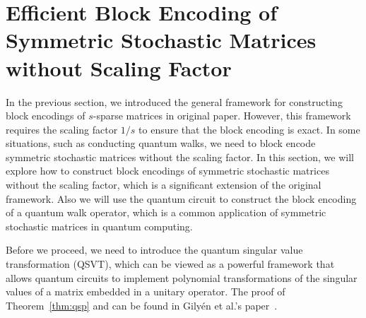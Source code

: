 \documentclass{article}
\begin{document}
    \section{Efficient Block Encoding of Symmetric Stochastic Matrices without Scaling Factor}\label{sec:efficient-block-encoding-of-symmetric-stochastic-matrices-without-scaling-factor}
    In the previous section, we introduced the general framework for constructing block encodings of $s$-sparse matrices in original paper.
    However, this framework requires the scaling factor $1/s$ to ensure that the block encoding is exact.
    In some situations, such as conducting quantum walks, we need to block encode symmetric stochastic matrices without the scaling factor.
    In this section, we will explore how to construct block encodings of symmetric stochastic matrices without the scaling factor, which is a significant extension of the original framework.
    Also we will use the quantum circuit to construct the block encoding of a quantum walk operator, which is a common application of symmetric stochastic matrices in quantum computing.

    Before we proceed, we need to introduce the quantum singular value transformation (QSVT), which can be viewed as a powerful framework that allows quantum circuits to implement polynomial transformations of the singular values of a matrix embedded in a unitary operator.
    The proof of Theorem~\ref{thm:qsp} and can be found in Gilyén et al.'s paper~\cite{Gilyen2019}.
\end{document}
